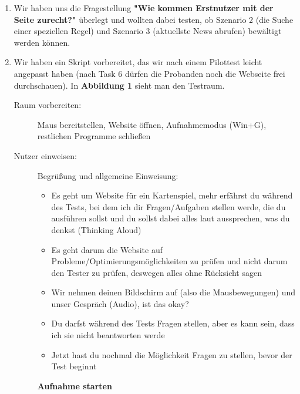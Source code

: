 \documentclass{scrartcl}
\begin{document}
\begin{enumerate}
\item Wir haben uns die Fragestellung \textbf{"Wie kommen Erstnutzer mit der Seite zurecht?"} überlegt und wollten dabei testen, ob Szenario 2 (die Suche einer speziellen Regel) und Szenario 3 (aktuellste News abrufen) bewältigt werden können.
\item Wir haben ein Skript vorbereitet, das wir nach einem Pilottest leicht angepasst haben (nach Task 6 dürfen die Probanden noch die Webseite frei durchschauen). In \textbf{Abbildung 1} sieht man den Testraum.
\begin{description}
\item[Raum vorbereiten:]
Maus bereitstellen, Website öffnen, Aufnahmemodus (Win+G), restlichen Programme schließen
\item[Nutzer einweisen:]
Begrüßung und allgemeine Einweisung:
\begin{itemize}
\item Es geht um Website für ein Kartenspiel, mehr erfährst du während des Tests, bei dem ich dir Fragen/Aufgaben stellen werde, die du ausführen sollst und du sollst dabei alles laut aussprechen, was du denkst (Thinking Aloud)
\item Es geht darum die Website auf Probleme/Optimierungsmöglichkeiten zu prüfen und nicht darum den Tester zu prüfen, deswegen alles ohne Rücksicht sagen
\item Wir nehmen deinen Bildschirm auf (also die Mausbewegungen) und unser Gespräch (Audio), ist das okay?
\item Du darfst während des Tests Fragen stellen, aber es kann sein, dass ich sie nicht beantworten werde
\item Jetzt hast du nochmal die Möglichkeit Fragen zu stellen, bevor der Test beginnt
\end{itemize}
\textbf{Aufnahme starten}
  

\end{description}
\end{enumerate}
\end{document}
